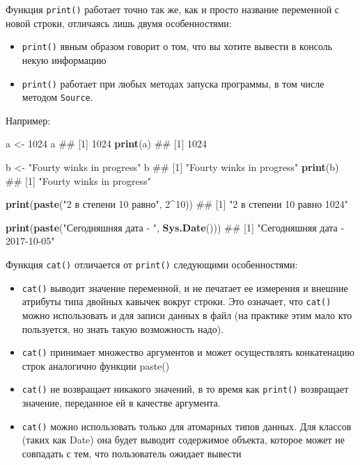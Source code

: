 \documentclass[]{book}
\newenvironment{Shaded}{\begin{snugshade}}{\end{snugshade}}
\newcommand{\KeywordTok}[1]{\textcolor[rgb]{0.13,0.29,0.53}{\textbf{#1}}}
\newcommand{\DecValTok}[1]{\textcolor[rgb]{0.00,0.00,0.81}{#1}}
\newcommand{\StringTok}[1]{\textcolor[rgb]{0.31,0.60,0.02}{#1}}
\newcommand{\OperatorTok}[1]{\textcolor[rgb]{0.81,0.36,0.00}{\textbf{#1}}}
\newcommand{\NormalTok}[1]{#1}
\providecommand{\tightlist}{%
  \setlength{\itemsep}{0pt}\setlength{\parskip}{0pt}}
\begin{document}
Функция \texttt{print()} работает точно так же, как и просто название
переменной с новой строки, отличаясь лишь двумя особенностями:

\begin{itemize}
\tightlist
\item
  \texttt{print()} явным образом говорит о том, что вы хотите вывести в
  консоль некую информацию
\item
  \texttt{print()} работает при любых методах запуска программы, в том
  числе методом \texttt{Source}.
\end{itemize}

Например:

\begin{Shaded}
\begin{Highlighting}[]
\NormalTok{a <-}\StringTok{ }\DecValTok{1024}
\NormalTok{a}
\NormalTok{## [1] 1024}
\KeywordTok{print}\NormalTok{(a)}
\NormalTok{## [1] 1024}

\NormalTok{b <-}\StringTok{ "Fourty winks in progress"}
\NormalTok{b}
\NormalTok{## [1] "Fourty winks in progress"}
\KeywordTok{print}\NormalTok{(b)}
\NormalTok{## [1] "Fourty winks in progress"}

\KeywordTok{print}\NormalTok{(}\KeywordTok{paste}\NormalTok{(}\StringTok{"2 в степени 10 равно"}\NormalTok{, }\DecValTok{2}\OperatorTok{^}\DecValTok{10}\NormalTok{))}
\NormalTok{## [1] "2 в степени 10 равно 1024"}

\KeywordTok{print}\NormalTok{(}\KeywordTok{paste}\NormalTok{(}\StringTok{"Сегодняшняя дата - "}\NormalTok{, }\KeywordTok{Sys.Date}\NormalTok{()))}
\NormalTok{## [1] "Сегодняшняя дата -  2017-10-05"}
\end{Highlighting}
\end{Shaded}

Функция \texttt{cat()} отличается от \texttt{print()} следующими
особенностями:

\begin{itemize}
\tightlist
\item
  \texttt{cat()} выводит значение переменной, и не печатает ее измерения
  и внешние атрибуты типа двойных кавычек вокруг строки. Это означает,
  что \texttt{cat()} можно использовать и для записи данных в файл (на
  практике этим мало кто пользуется, но знать такую возможность надо).
\item
  \texttt{cat()} принимает множество аргументов и может осуществлять
  конкатенацию строк аналогично функции paste()
\item
  \texttt{cat()} не возвращает никакого значений, в то время как
  \texttt{print()} возвращает значение, переданное ей в качестве
  аргумента.
\item
  \texttt{cat()} можно использовать только для атомарных типов данных.
  Для классов (таких как Date) она будет выводит содержимое объекта,
  которое может не совпадать с тем, что пользователь ожидает вывести
\end{itemize}
\end{document}
